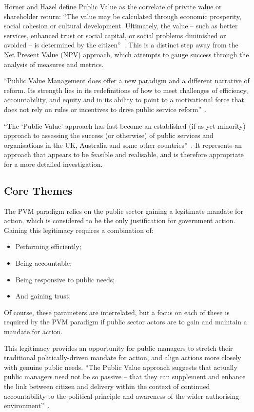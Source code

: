\documentclass[conference]{IEEEtran}
\begin{document}
Horner and Hazel define Public Value as the correlate of private value
or shareholder return: ``The value may be calculated through economic
prosperity, social cohesion or cultural development. Ultimately, the
value -- such as better services, enhanced trust or social capital, or
social problems diminished or avoided -- is determined by the
citizen''~\cite{horner+hazel:2005}. This is a distinct step away from
the Net Present Value (NPV) approach, which attempts to gauge success
through the analysis of measures and metrics.

``Public Value Management does offer a new paradigm and a different
narrative of reform. Its strength lies in its redefinitions of how to
meet challenges of efficiency, accountability, and equity and in its
ability to point to a motivational force that does not rely on rules
or incentives to drive public service reform''~\cite{stoker:2006}.

``The `Public Value' approach has fast become an established (if as
yet minority) approach to assessing the success (or otherwise) of
public services and organisations in the UK, Australia and some other
countries''~\cite{talbot:2008}. It represents an approach that appears
to be feasible and realisable, and is therefore appropriate for a more
detailed investigation.

\subsection{Core Themes}
The PVM paradigm relies on the public sector gaining a legitimate
mandate for action, which is considered to be the only justification
for government action. Gaining this legitimacy requires a combination
of:

\begin{itemize} 
\item Performing efficiently;
\item Being accountable;
\item Being responsive to public needs;
\item And gaining trust.
\end{itemize}

Of course, these parameters are interrelated, but a focus on each of
these is required by the PVM paradigm if public sector actors are to
gain and maintain a mandate for action.

This legitimacy provides an opportunity for public managers to stretch
their traditional politically-driven mandate for action, and align
actions more closely with genuine public needs. ``The Public Value
approach suggests that actually public managers need not be so
passive -- that they can supplement and enhance the link between citizen
and delivery within the context of continued accountability to the
political principle and awareness of the wider authorising
environment''~\cite{gains+stoker:2009}.
\end{document}
